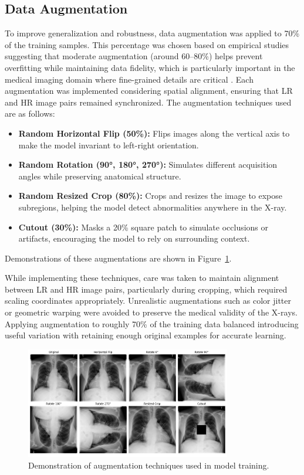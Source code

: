 \documentclass{article} %
\begin{document}
\subsection{Data Augmentation}

To improve generalization and robustness, data augmentation was applied to 70\% of the training samples. This percentage was chosen based on empirical studies suggesting that moderate augmentation (around 60--80\%) helps prevent overfitting while maintaining data fidelity, which is particularly important in the medical imaging domain where fine-grained details are critical \citep{athalye23, sanaat22}. Each augmentation was implemented considering spatial alignment, ensuring that LR and HR image pairs remained synchronized. The augmentation techniques used are as follows:

\begin{itemize}
    \item \textbf{Random Horizontal Flip (50\%):} Flips images along the vertical axis to make the model invariant to left-right orientation.
    \item \textbf{Random Rotation (90°, 180°, 270°):} Simulates different acquisition angles while preserving anatomical structure.
    \item \textbf{Random Resized Crop (80\%):} Crops and resizes the image to expose subregions, helping the model detect abnormalities anywhere in the X-ray.
    \item \textbf{Cutout (30\%):} Masks a 20\% square patch to simulate occlusions or artifacts, encouraging the model to rely on surrounding context.
\end{itemize}

Demonstrations of these augmentations are shown in Figure~\ref{augmentations}.

While implementing these techniques, care was taken to maintain alignment between LR and HR image pairs, particularly during cropping, which required scaling coordinates appropriately. Unrealistic augmentations such as color jitter or geometric warping were avoided to preserve the medical validity of the X-rays. Applying augmentation to roughly 70\% of the training data balanced introducing useful variation with retaining enough original examples for accurate learning.

\begin{figure}[h!]
\centering
\includegraphics[width=0.8\textwidth]{Figs/augmentation.jpg}
\caption{Demonstration of augmentation techniques used in model training.}
\label{augmentations}
\end{figure}
\end{document}
